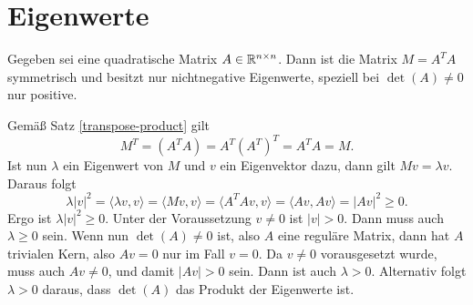 \section{Eigenwerte}

\begin{Satz}
Gegeben sei eine quadratische Matrix $A\in\mathbb R^{n\times n}$.
Dann ist die Matrix $M=A^T A$ symmetrisch und besitzt nur
nichtnegative Eigenwerte, speziell bei $\det(A)\ne 0$ nur positive.
\end{Satz}

\begin{Beweis}
Gemäß Satz \ref{transpose-product} gilt
\begin{equation}
M^T = (A^T A) = A^T (A^T)^T = A^T A = M.
\end{equation}
Ist nun $\lambda$ ein Eigenwert von $M$ und $v$ ein Eigenvektor dazu,
dann gilt $Mv=\lambda v$. Daraus folgt
\begin{equation}
\lambda |v|^2 = \langle\lambda v,v\rangle
= \langle Mv,v\rangle = \langle A^T Av,v\rangle
= \langle Av,Av\rangle = |Av|^2\ge 0.
\end{equation}
Ergo ist $\lambda|v|^2\ge 0$. Unter der Voraussetzung $v\ne 0$ ist
$|v|>0$. Dann muss auch $\lambda\ge 0$ sein. Wenn nun $\det(A)\ne 0$
ist, also $A$ eine reguläre Matrix, dann hat $A$ trivialen Kern,
also $Av=0$ nur im Fall $v=0$. Da $v\ne 0$ vorausgesetzt wurde,
muss auch $Av\ne 0$, und damit $|Av|>0$ sein. Dann ist auch
$\lambda>0$. Alternativ folgt $\lambda>0$ daraus, dass $\det(A)$
das Produkt der Eigenwerte ist.\;\qedsymbol
\end{Beweis}
